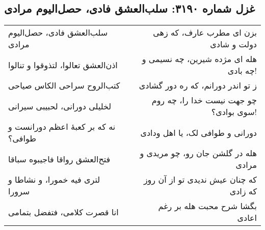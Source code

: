 \begin{center}
\section*{غزل شماره ۳۱۹۰: سلب‌العشق فادی، حصل‌الیوم مرادی}
\label{sec:3190}
\begin{longtable}{l p{0.5cm} r}
سلب‌العشق فادی، حصل‌الیوم مرادی
&&
بزن ای مطرب عارف، که زهی دولت و شادی
\\
اذن‌العشق تعالوا، لتذوقوا و تنالوا
&&
هله ای مژده شیرین، چه نسیمی و چه بادی!
\\
کتب‌الروح سراحی الکاس صیاحی
&&
ز تو اندر دورانم، که ره دور گشادی
\\
لخلیلی دورانی، لحبیبی سیرانی
&&
چو جهت نیست خدا را، چه روم سوی بوادی؟!
\\
نه که بر کعبهٔ اعظم دورانست و طوافی؟
&&
دورانی و طوافی لک، یا اهل ودادی
\\
فتح‌العشق رواقا فاجیبوه سباقا
&&
هله در گلشن جان رو، چو مریدی و مرادی
\\
لتری فیه خمورا، و نشاطا و سرورا
&&
که چنان عیش ندیدی تو از آن روز که زادی
\\
انا قصرت کلامی، فتفضل بتمامی
&&
بگشا شرح محبت هله بر رغم اعادی
\\
\end{longtable}
\end{center}
